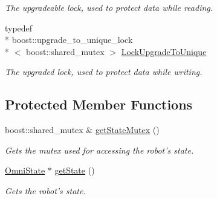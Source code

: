 \begin{DoxyCompactItemize}
\begin{DoxyCompactList}\small\item\em The upgradeable lock, used to protect data while reading. \end{DoxyCompactList}\item 
\hypertarget{classOmniBase_a017d027fa1c72afe7b13c91869325364}{typedef \\*
boost\-::upgrade\-\_\-to\-\_\-unique\-\_\-lock\\*
$<$ boost\-::shared\-\_\-mutex $>$ \hyperlink{classOmniBase_a017d027fa1c72afe7b13c91869325364}{Lock\-Upgrade\-To\-Unique}}\label{classOmniBase_a017d027fa1c72afe7b13c91869325364}

\begin{DoxyCompactList}\small\item\em The upgraded lock, used to protect data while writing. \end{DoxyCompactList}\end{DoxyCompactItemize}
\subsection*{Protected Member Functions}
\begin{DoxyCompactItemize}
\item 
boost\-::shared\-\_\-mutex \& \hyperlink{classOmniBase_ae742a01f62b6e312c4704eea0d250f9d}{get\-State\-Mutex} ()
\begin{DoxyCompactList}\small\item\em Gets the mutex used for accessing the robot's state. \end{DoxyCompactList}\item 
\hyperlink{structOmniBase_1_1OmniState}{Omni\-State} $\ast$ \hyperlink{classOmniBase_a5c0ece986d3fbfa05331d0c885051134}{get\-State} ()
\begin{DoxyCompactList}\small\item\em Gets the robot's state. \end{DoxyCompactList}\end{DoxyCompactItemize}
